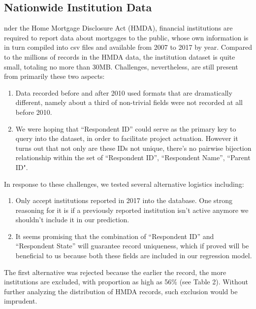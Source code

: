 \documentclass[conference,compsoc]{IEEEtran}
\begin{document}
\subsection{Nationwide Institution Data}

nder the Home Mortgage Disclosure Act (HMDA), financial institutions are required to report data about mortgages to the public, whose own information is in turn compiled into csv files and available from 2007 to 2017 by year. Compared to the millions of records in the HMDA data, the institution dataset is quite small, totaling no more than 30MB. Challenges, nevertheless, are still present from primarily these two aspects: 

\begin{enumerate}
\item Data recorded before and after 2010 used formats that are dramatically different, namely about a third of non-trivial fields were not recorded at all before 2010. 
\item We were hoping that “Respondent ID” could serve as the primary key to query into the dataset, in order to facilitate project actuation. However it turns out that not only are these IDs not unique, there’s no pairwise bijection relationship within the set of {“Respondent ID”, “Respondent Name”,  “Parent ID"}. 
\end{enumerate}


In response to these challenges, we tested several alternative logistics including:  
\begin{enumerate}

\item Only accept institutions reported in 2017 into the database. One strong reasoning for it is if a previously reported institution isn’t active anymore we shouldn’t include it in our prediction.
\item  It seems promising that the combination of “Respondent ID” and “Respondent State” will guarantee record uniqueness, which if proved will be beneficial to us because both these fields are included in our regression model.

\end{enumerate}



The first alternative was rejected because the earlier the record, the more institutions are excluded, with proportion as high as 56\% (see Table 2). Without further analyzing the distribution of HMDA records, such exclusion would be imprudent.
\end{document}

